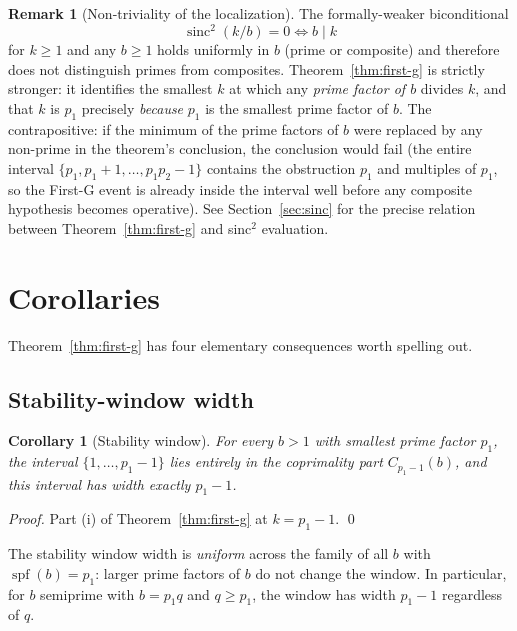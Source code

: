 \documentclass[11pt,reqno]{amsart}
\newtheorem{corollary}[theorem]{Corollary}
\theoremstyle{definition}
\newtheorem{remark}[theorem]{Remark}
\DeclareMathOperator{\spf}{spf}
\begin{document}
\begin{remark}[Non-triviality of the localization]
\label{rem:nontrivial}
The formally-weaker biconditional
\[
  \operatorname{sinc}^2(k/b) = 0 \iff b \mid k
\]
for $k \ge 1$ and any $b \ge 1$ holds uniformly in $b$ (prime or composite)
and therefore does not distinguish primes from composites. Theorem~\ref{thm:first-g}
is strictly stronger: it identifies the smallest $k$ at which any
\emph{prime factor of $b$} divides $k$, and that $k$ is $p_1$ precisely
\emph{because} $p_1$ is the smallest prime factor of $b$.
The contrapositive: if the minimum of the prime factors of $b$ were replaced by
any non-prime in the theorem's conclusion, the conclusion would fail (the
entire interval $\{p_1, p_1 + 1, \ldots, p_1 p_2 - 1\}$ contains the
obstruction $p_1$ and multiples of $p_1$, so the First-G event is already
inside the interval well before any composite hypothesis becomes operative).
See Section~\ref{sec:sinc} for the precise relation between
Theorem~\ref{thm:first-g} and sinc${}^2$ evaluation.
\end{remark}

\section{Corollaries}
\label{sec:corollaries}

Theorem~\ref{thm:first-g} has four elementary consequences worth spelling out.

\subsection{Stability-window width}
\label{ssec:stab}

\begin{corollary}[Stability window]
\label{cor:stab}
For every $b > 1$ with smallest prime factor $p_1$, the interval
$\{1, \ldots, p_1 - 1\}$ lies entirely in the coprimality part $C_{p_1 - 1}(b)$,
and this interval has width exactly $p_1 - 1$.
\end{corollary}

\begin{proof}
Part (i) of Theorem~\ref{thm:first-g} at $k = p_1 - 1$.
\qed
\end{proof}

The stability window width is \emph{uniform} across the family of all $b$
with $\spf(b) = p_1$: larger prime factors of $b$ do not change the
window. In particular, for $b$ semiprime with $b = p_1 q$ and $q \ge p_1$,
the window has width $p_1 - 1$ regardless of $q$.
\end{document}
